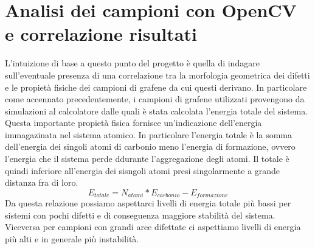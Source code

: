 \documentclass[12pt,a4paper,openright,twoside]{report}
\begin{document}
\section{Analisi dei campioni con OpenCV e correlazione risultati}
L'intuizione di base a questo punto del progetto è quella di indagare sull'eventuale presenza di una correlazione tra la morfologia geometrica dei difetti e le propietà fisiche dei campioni di grafene da cui questi derivano. 
In particolare come accennato precedentemente, i campioni di grafene utilizzati provengono da simulazioni al calcolatore dalle quali è stata calcolata l'energia totale del sistema. Questa importante propietà fisica fornisce un'indicazione dell'energia immagazinata nel sistema atomico. In particolare l'energia totale è la somma dell'energia dei singoli atomi di carbonio meno l'energia di formazione, ovvero l'energia che il sistema perde ddurante l'aggregazione degli atomi. Il totale è quindi inferiore all'energia dei sisngoli atomi presi singolarmente a grande distanza fra di loro. 
\begin{equation}
    E_{totale} = N_{atomi} * E_{carbonio} - E_{formazione} 
\end{equation}
Da questa relazione possiamo aspettarci livelli di energia totale più bassi per sistemi con pochi difetti e di conseguenza maggiore stabilità del sistema. Viceversa per campioni con grandi aree difettate ci aspettiamo livelli di energia più alti e in generale più instabilità.
\end{document}
